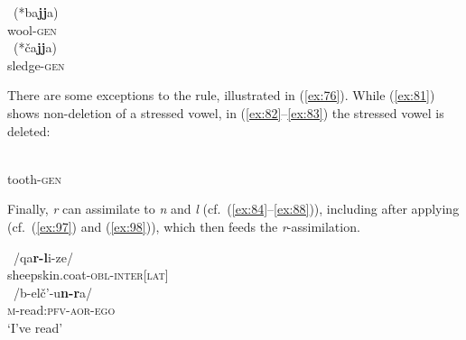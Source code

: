 \documentclass[output=paper]{langsci/langscibook}
\begin{document}
\ex \label{ex:79} %
~\textup{(*}{ba\textbf{jj}a}\textup{)}\\
wool-\textsc{gen}\\

\ex \label{ex:80} %
~\textup{(*}{ča\textbf{jj}a}\textup{)}\\
sledge-\textsc{gen}\\
\z


There are some exceptions to the  rule, illustrated in
(\ref{ex:76}). While (\ref{ex:81}) shows non-deletion of a stressed vowel, in (\ref{ex:82}–\ref{ex:83})
the stressed vowel is deleted:

\ea \label{ex:81} %
\\
tooth-\textsc{gen}\\

\ex \label{ex:82} %
\ea {}%
\exsameline %
\z

\ex \label{ex:83} %
\ea {}%
\exsameline %
\z
\z


Finally, \emph{r} can assimilate to \emph{n} and \emph{l} (cf.\
(\ref{ex:84}–\ref{ex:88})), including after applying  (cf.\ (\ref{ex:97}) and
(\ref{ex:98})), which then feeds the \emph{r}-assimilation.

\ea \label{ex:84} %
~/{qa\textbf{r-l}i-ze}/\\
sheepskin.coat-\textsc{obl}-\textsc{inter}[\textsc{lat}]\\

\ex \label{ex:85} %
~/{b-elč'-u\textbf{n-r}a}/\\
\textsc{m}-read:\textsc{pfv}-\textsc{aor}-\textsc{ego}\\
\glt `I've read'
\end{document}

